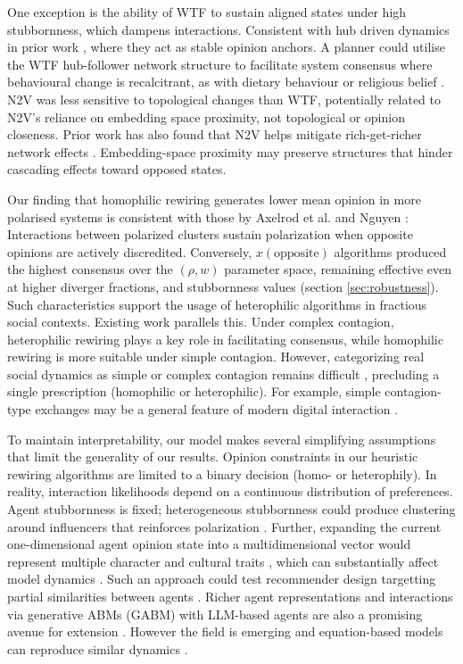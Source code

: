 \documentclass[unnumsec,webpdf,contemporary,large]{oup-authoring-template}%
\theoremstyle{thmstyleone}%
\theoremstyle{thmstyletwo}%
\theoremstyle{thmstylethree}%
\begin{document}
One exception is the ability of WTF to sustain aligned states under high stubbornness, which dampens interactions. Consistent with hub driven dynamics in prior work \citep{meng_dynamics_2024}, where they act as stable opinion anchors. A planner could utilise the WTF hub-follower network structure to facilitate system consensus where behavioural change is recalcitrant, as with dietary behaviour or religious belief \citep{everall_pareto_2025}.  N2V was less sensitive to topological changes than WTF, potentially related to N2V's reliance on embedding space proximity, not topological or opinion closeness. Prior work has also found that N2V helps mitigate rich-get-richer network effects \cite{ferrara_link_2022}. Embedding-space proximity may preserve structures that hinder cascading effects toward opposed states.

Our finding that homophilic rewiring generates lower mean opinion in more polarised systems is consistent with those by Axelrod et al. \citep{axelrod_preventing_2021} and Nguyen \citep{nguyen_echo_2020}: Interactions between polarized clusters sustain polarization when opposite opinions are actively discredited. Conversely, $x(\text{opposite})$ algorithms produced the highest consensus over the
$(\rho, w)$ parameter space, remaining effective even at higher diverger fractions, and stubbornness values (section \ref{sec:robustness}). Such characteristics support the usage of heterophilic algorithms in fractious social contexts. Existing work \cite{borges_how_2024} parallels this. Under complex contagion, heterophilic rewiring plays a key role in facilitating consensus, while homophilic rewiring is more suitable under simple contagion. However, categorizing real social dynamics as simple or complex contagion remains difficult \citep{fink_investigating_2016, horsevad_transition_2022}, precluding a single prescription (homophilic or heterophilic). For example, simple contagion-type exchanges may be a general feature of modern digital interaction \cite{bak-coleman_stewardship_2021}.

To maintain interpretability, our model makes several simplifying assumptions that limit the generality of our results.  Opinion constraints in our heuristic rewiring algorithms are limited to a binary decision (homo- or heterophily). In reality, interaction likelihoods depend on a continuous distribution of preferences. Agent stubbornness is fixed; heterogeneous stubbornness could produce clustering around influencers that reinforces polarization \cite{andersson_dynamics_2021}. Further, expanding the current one-dimensional agent opinion state into a multidimensional vector would represent multiple character and cultural traits \citep{Pham2021, Axelrod1997}, which can substantially affect model dynamics \cite{baumannEmergencePolarizedIdeological2021}. Such an approach could test recommender design targetting partial similarities between agents \citep{dunbar_anatomy_2018, gladston_social_2019}. Richer agent representations and interactions via generative ABMs (GABM) with LLM-based agents are also a promising avenue for extension \cite{vezhnevets_generative_2023, tornberg_simulating_2023}. However the field is emerging and equation-based models can reproduce similar dynamics \cite{gu_large_2025}. 
\end{document}

